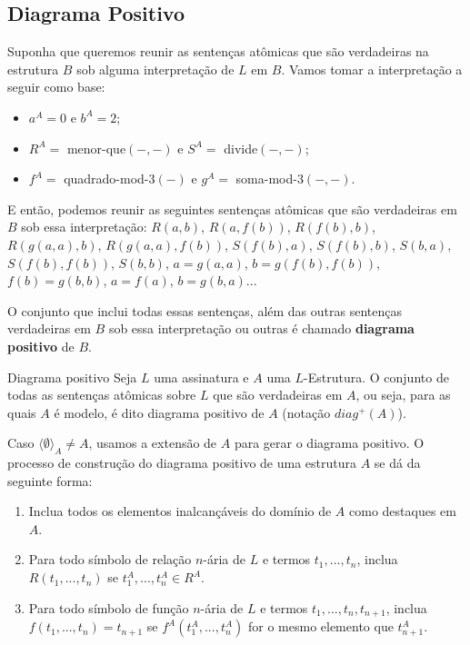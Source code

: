 \subsection{Diagrama Positivo}
Suponha que queremos reunir as sentenças atômicas que são verdadeiras na estrutura $B$ sob alguma interpretação de $L$ em $B$. Vamos tomar a interpretação a seguir como base:
\begin{itemize}
    \item $a^A = 0$ e $b^A = 2$;
    \item $R^A =$ menor-que$(-,-)$ e $S^A =$ divide$(-,-)$;
    \item $f^A =$ quadrado-mod-3$(-)$ e $g^A =$ soma-mod-3$(-,-)$.
\end{itemize}
E então, podemos reunir as seguintes sentenças atômicas que são verdadeiras em $B$ sob essa interpretação: $R(a,b)$, $R(a, f(b))$, $R(f(b), b)$, $R(g(a,a), b)$, $R(g(a,a), f(b))$, $S(f(b), a)$, $S(f(b), b)$, $S(b, a)$, $S(f(b),f(b))$, $S(b,b)$, $a = g(a,a)$, $b = g(f(b),f(b))$, $f(b) = g(b,b)$, $a = f(a)$, $b = g(b, a)$...

O conjunto que inclui todas essas sentenças, além das outras sentenças verdadeiras em $B$ sob essa interpretação ou outras é chamado \textbf{diagrama positivo} de $B$.
\begin{definition}{Diagrama positivo}
    Seja $L$ uma assinatura e $A$ uma $L$-Estrutura. O conjunto de todas as sentenças atômicas sobre $L$ que são verdadeiras em $A$, ou seja, para as quais $A$ é modelo, é dito diagrama positivo de $A$ (notação $diag^+(A)$).

    Caso $\langle \emptyset\rangle_A \neq A$, usamos a extensão de $A$ para gerar o diagrama positivo.
    O processo de construção do diagrama positivo de uma estrutura $A$ se dá da seguinte forma:
    \begin{enumerate}
        \item Inclua todos os elementos inalcançáveis do domínio de $A$ como destaques em $A$.
        \item Para todo símbolo de relação $n$-ária de $L$ e termos $t_1,...,t_n$, inclua $R(t_1,...,t_n)$ se $t_1^A,...,t_n^A \in R^A$.
        \item Para todo símbolo de função $n$-ária de $L$ e termos $t_1,...,t_n,t_{n+1}$, inclua $f(t_1,...,t_n) = t_{n+1}$ se $f^A(t_1^A,...,t_n^A)$ for o mesmo elemento que $t_{n+1}^A$.
    \end{enumerate}
\end{definition}

